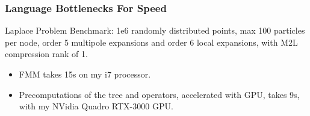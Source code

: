 \begin{frame}
    \frametitle{Language Bottlenecks For Speed}
    Laplace Problem Benchmark: 1e6 randomly distributed points, max 100 particles per node, order 5 multipole expansions and order 6 local expansions, with M2L compression rank of 1.

    \begin{itemize}
        \item FMM takes 15s on my i7 processor.
        \item Precomputations of the tree and operators, accelerated with GPU, takes 9s, with my NVidia Quadro RTX-3000 GPU.
    \end{itemize}

\end{frame}